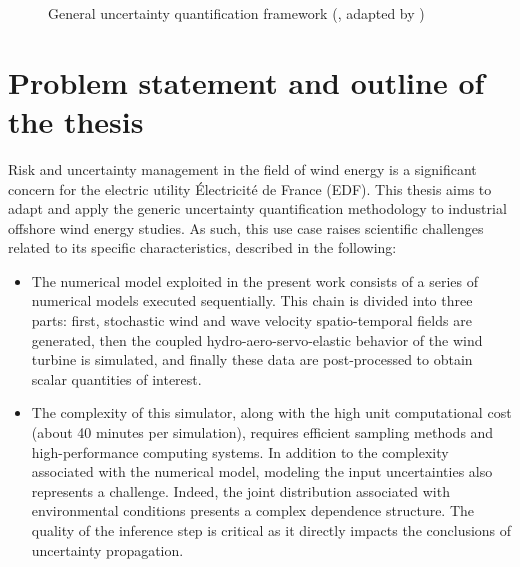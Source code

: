 \begin{figure}[!h]
    \centering
    
    \caption{General uncertainty quantification framework (\citealp{rocquigny_2008}, adapted by \citealp{ajenjo_2023})}
    \label{fig:UQ_methodo}
\end{figure}


\section*{Problem statement and outline of the thesis}

Risk and uncertainty management in the field of wind energy is a significant concern for the electric utility Électricité de France (EDF). 
This thesis aims to adapt and apply the generic uncertainty quantification methodology to industrial offshore wind energy studies. 
As such, this use case raises scientific challenges related to its specific characteristics, described in the following:
\begin{itemize}
    \item The numerical model exploited in the present work consists of a series of numerical models executed sequentially. 
    This chain is divided into three parts: first, stochastic wind and wave velocity spatio-temporal fields are generated, 
    then the coupled hydro-aero-servo-elastic behavior of the wind turbine is simulated, 
    and finally these data are post-processed to obtain scalar quantities of interest. 
    \item The complexity of this simulator, along with the high unit computational cost (about 40 minutes per simulation), requires efficient sampling methods and high-performance computing systems. 
    In addition to the complexity associated with the numerical model, modeling the input uncertainties also represents a challenge. 
    Indeed, the joint distribution associated with environmental conditions presents a complex dependence structure.   
    The quality of the inference step is critical as it directly impacts the conclusions of uncertainty propagation.
\end{itemize}

